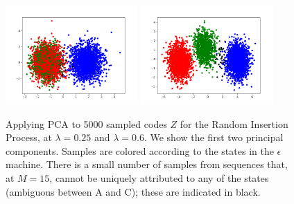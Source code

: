 \documentclass[11pt,letterpaper]{article}
\begin{document}
\begin{figure}
\includegraphics[width=0.45\textwidth]{code/figures/foo_pca_2.png}
\includegraphics[width=0.45\textwidth]{code/figures/foo_pca_3.png}
	\caption{Applying PCA to 5000 sampled codes $Z$ for the Random Insertion Process, at $\lambda = 0.25$ and $\lambda = 0.6$. We show the first two principal components. Samples are colored according to the states in the $\epsilon$ machine. There is a small number of samples from sequences that, at $M=15$, cannot be uniquely attributed to any of the states (ambiguous between A and C); these are indicated in black.}\label{fig:latent}
\end{figure}
\end{document}
